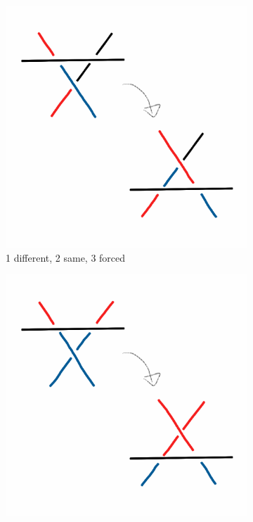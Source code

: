 \documentclass[12pt,letterpaper]{article}
\theoremstyle{definition}
\begin{document}
\begin{figure}[h!]
    \centering
    \begin{subfigure}{.3\textwidth}
        \centering
        \includegraphics[width=\textwidth]{knotpics/1d2s.png}
        \caption{1 different, 2 same, 3 forced}
    \end{subfigure}
    \quad
    \begin{subfigure}{.3\textwidth}
        \centering
        \includegraphics[width=\textwidth]{knotpics/1d2d3s.png}

\end{subfigure}
\end{figure}
\end{document}
